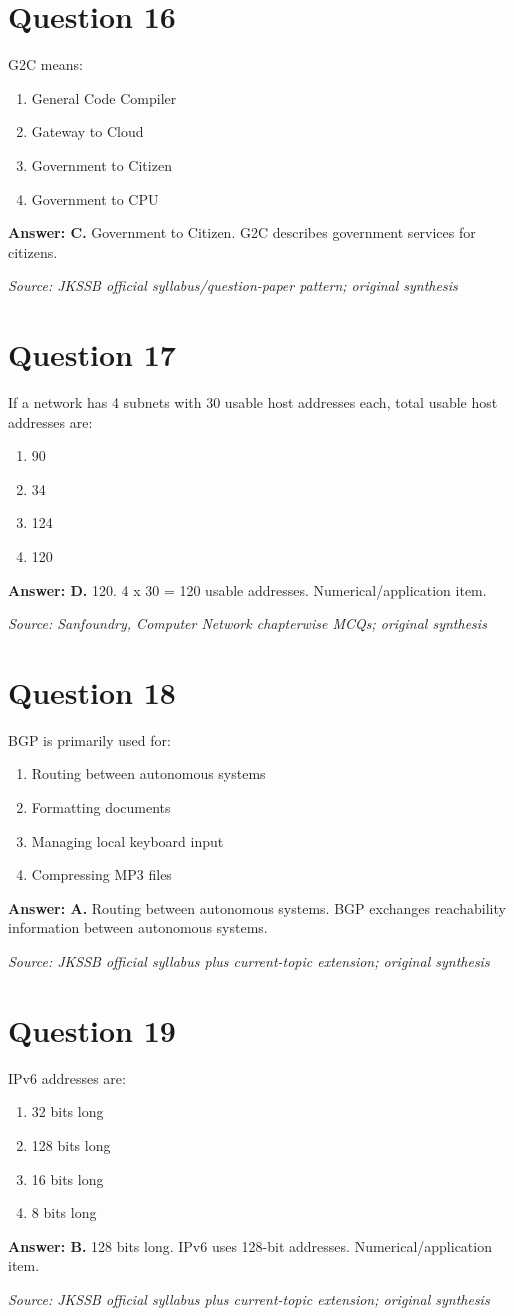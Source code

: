 \documentclass[11pt,a4paper]{book}
\newcommand{\source}[1]{\par\smallskip\textit{Source: #1}}
\newcommand{\answer}[2]{\par\textbf{Answer: #1.} #2}
\begin{document}
\section*{Question 16}
G2C means:
\begin{enumerate}[label=\Alph*.]
\item General Code Compiler
\item Gateway to Cloud
\item Government to Citizen
\item Government to CPU
\end{enumerate}
\answer{C}{Government to Citizen. G2C describes government services for citizens.}
\source{JKSSB official syllabus/question-paper pattern; original synthesis}
\section*{Question 17}
If a network has 4 subnets with 30 usable host addresses each, total usable host addresses are:
\begin{enumerate}[label=\Alph*.]
\item 90
\item 34
\item 124
\item 120
\end{enumerate}
\answer{D}{120. 4 x 30 = 120 usable addresses. Numerical/application item.}
\source{Sanfoundry, Computer Network chapterwise MCQs; original synthesis}
\section*{Question 18}
BGP is primarily used for:
\begin{enumerate}[label=\Alph*.]
\item Routing between autonomous systems
\item Formatting documents
\item Managing local keyboard input
\item Compressing MP3 files
\end{enumerate}
\answer{A}{Routing between autonomous systems. BGP exchanges reachability information between autonomous systems.}
\source{JKSSB official syllabus plus current-topic extension; original synthesis}
\section*{Question 19}
IPv6 addresses are:
\begin{enumerate}[label=\Alph*.]
\item 32 bits long
\item 128 bits long
\item 16 bits long
\item 8 bits long
\end{enumerate}
\answer{B}{128 bits long. IPv6 uses 128-bit addresses. Numerical/application item.}
\source{JKSSB official syllabus plus current-topic extension; original synthesis}
\end{document}
